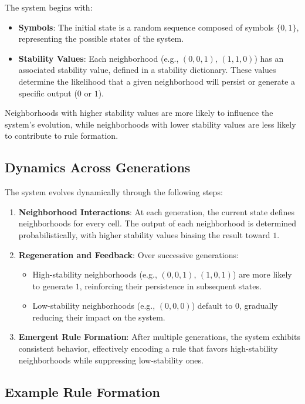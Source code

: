 \documentclass[entropy,article,submit,pdftex,moreauthors]{Definitions/mdpi}
\begin{document}
The system begins with:
\begin{itemize}
    \item \textbf{Symbols}: The initial state is a random sequence composed of symbols \( \{0, 1\} \), representing the possible states of the system.
    \item \textbf{Stability Values}: Each neighborhood (e.g., \((0, 0, 1)\), \((1, 1, 0)\)) has an associated stability value, defined in a stability dictionary. These values determine the likelihood that a given neighborhood will persist or generate a specific output (\(0\) or \(1\)).
\end{itemize}

Neighborhoods with higher stability values are more likely to influence the system's evolution, while neighborhoods with lower stability values are less likely to contribute to rule formation.

\subsection{Dynamics Across Generations}

The system evolves dynamically through the following steps:
\begin{enumerate}
    \item \textbf{Neighborhood Interactions}: At each generation, the current state defines neighborhoods for every cell. The output of each neighborhood is determined probabilistically, with higher stability values biasing the result toward \(1\).
    \item \textbf{Regeneration and Feedback}: Over successive generations:
    \begin{itemize}
        \item High-stability neighborhoods (e.g., \((0, 0, 1)\), \((1, 0, 1)\)) are more likely to generate \(1\), reinforcing their persistence in subsequent states.
        \item Low-stability neighborhoods (e.g., \((0, 0, 0)\)) default to \(0\), gradually reducing their impact on the system.
    \end{itemize}
    \item \textbf{Emergent Rule Formation}: After multiple generations, the system exhibits consistent behavior, effectively encoding a rule that favors high-stability neighborhoods while suppressing low-stability ones.
\end{enumerate}

\subsection{Example Rule Formation}
\end{document}
